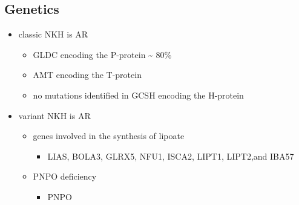 \documentclass{scrartcl}
\begin{document}
\subsection{Genetics}
\label{sec:org1ec3eef}
\begin{itemize}
\item classic NKH is AR
\begin{itemize}
\item GLDC encoding the P-protein \textasciitilde{} 80\%
\item AMT encoding the T-protein
\item no mutations identified in GCSH encoding the H-protein
\end{itemize}
\item variant NKH is AR
\begin{itemize}
\item genes involved in the synthesis of lipoate
\begin{itemize}
\item LIAS, BOLA3, GLRX5, NFU1, ISCA2, LIPT1, LIPT2,and IBA57
\end{itemize}
\item PNPO deficiency
\begin{itemize}
\item PNPO
\end{itemize}
\end{itemize}
\end{itemize}
\end{document}
